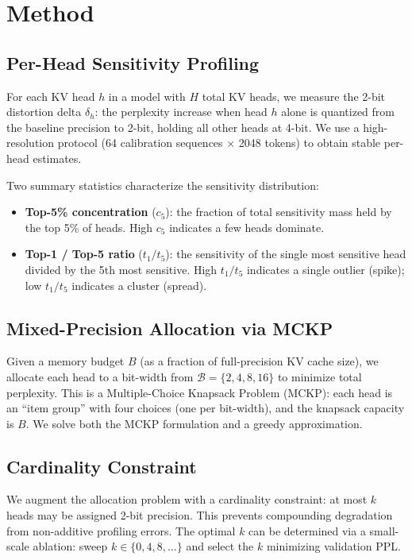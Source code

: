 \documentclass[11pt,a4paper]{article}
\newcommand{\topkconc}{\ensuremath{c_5}}
\newcommand{\tratio}{\ensuremath{t_1/t_5}}
\begin{document}
\section{Method}

\subsection{Per-Head Sensitivity Profiling}

For each KV head $h$ in a model with $H$ total KV heads, we measure the 2-bit distortion delta $\delta_h$: the perplexity increase when head $h$ alone is quantized from the baseline precision to 2-bit, holding all other heads at 4-bit.
We use a high-resolution protocol (64 calibration sequences $\times$ 2048 tokens) to obtain stable per-head estimates.

Two summary statistics characterize the sensitivity distribution:
\begin{itemize}
    \item \textbf{Top-5\% concentration} (\topkconc): the fraction of total sensitivity mass held by the top 5\% of heads.
    High \topkconc{} indicates a few heads dominate.
    \item \textbf{Top-1 / Top-5 ratio} (\tratio): the sensitivity of the single most sensitive head divided by the 5th most sensitive.
    High \tratio{} indicates a single outlier (spike); low \tratio{} indicates a cluster (spread).
\end{itemize}

\subsection{Mixed-Precision Allocation via MCKP}

Given a memory budget $B$ (as a fraction of full-precision KV cache size), we allocate each head to a bit-width from $\mathcal{B} = \{2, 4, 8, 16\}$ to minimize total perplexity.
This is a Multiple-Choice Knapsack Problem (MCKP): each head is an ``item group'' with four choices (one per bit-width), and the knapsack capacity is $B$.
We solve both the MCKP formulation and a greedy approximation.

\subsection{Cardinality Constraint}

We augment the allocation problem with a cardinality constraint: at most $k$ heads may be assigned 2-bit precision.
This prevents compounding degradation from non-additive profiling errors.
The optimal $k$ can be determined via a small-scale ablation: sweep $k \in \{0, 4, 8, \ldots\}$ and select the $k$ minimizing validation PPL.
\end{document}

